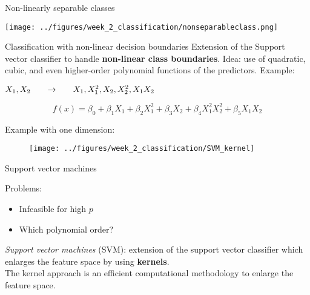 \documentclass[notes]{beamer}          %
\begin{document}
\begin{frame}{Non-linearly separable classes}
\begin{center}
\texttt{[image: ../figures/week\_2\_classification/nonseparableclass.png]}  
\end{center}


\end{frame}

\begin{frame}{Classification with non-linear decision boundaries}
Extension of the Support vector classifier to handle \textbf{non-linear class boundaries}. 
Idea: use of quadratic, cubic, and even higher-order polynomial functions of the predictors.
Example:
\begin{center}{
$X_1, X_2 \hspace{0.05\textwidth}\to\hspace{0.05\textwidth} X_1, X^2_1, X_2, X^2_2, X_1X_2$}
\end{center}
\begin{equation*}
	f(x)=\beta_0 + \beta_1X_1 + \beta_2X^2_1 + \beta_3X_2 + 		\beta_4X^2_1X^2_2+ \beta_5X_1X_2 
\end{equation*}

Example with one dimension:
\begin{figure}
  \texttt{[image: ../figures/week\_2\_classification/SVM\_kernel]}  
\end{figure}


\end{frame}


\begin{frame}{Support vector machines}

Problems:
\begin{itemize}
	\item Infeasible for high $p$
	\item Which polynomial order?
\end{itemize}
\vspace{0.5cm}
\textit{Support vector machines} (SVM): extension of the support vector classifier which enlarges the feature space by using \textbf{kernels}.\\
\vspace{0.5cm}
The kernel approach is an efficient computational methodology to enlarge the feature space.


\end{frame}
\end{document}
